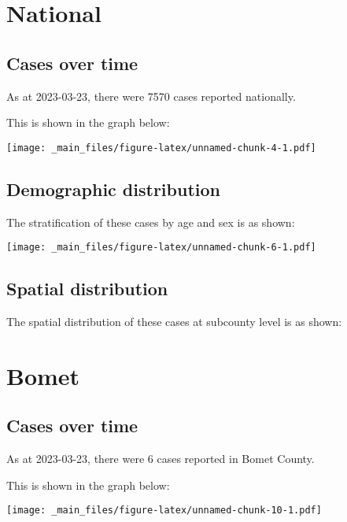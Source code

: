 \documentclass[
]{book}
\author{}
\date{\vspace{-2.5em}2023-04-11}
\begin{document}
{
\setcounter{tocdepth}{1}
\tableofcontents
}
\hypertarget{national}{%
\chapter{National}\label{national}}

\hypertarget{cases-over-time}{%
\section{Cases over time}\label{cases-over-time}}

As at 2023-03-23, there were 7570 cases reported nationally.

This is shown in the graph below:

\texttt{[image: \_main\_files/figure-latex/unnamed-chunk-4-1.pdf]}

\hypertarget{demographic-distribution}{%
\section{Demographic distribution}\label{demographic-distribution}}

The stratification of these cases by age and sex is as shown:

\texttt{[image: \_main\_files/figure-latex/unnamed-chunk-6-1.pdf]}

\hypertarget{spatial-distribution}{%
\section{Spatial distribution}\label{spatial-distribution}}

The spatial distribution of these cases at subcounty level is as shown:

\hypertarget{bomet}{%
\chapter{Bomet}\label{bomet}}

\hypertarget{cases-over-time-1}{%
\section{Cases over time}\label{cases-over-time-1}}

As at 2023-03-23, there were 6 cases reported in Bomet County.

This is shown in the graph below:

\texttt{[image: \_main\_files/figure-latex/unnamed-chunk-10-1.pdf]}
\end{document}
